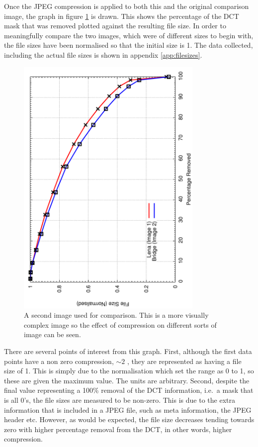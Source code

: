 		Once the JPEG compression is applied to both this and the original comparison image, the graph in figure \ref{fig:comparason_graph} is drawn. This shows the percentage of the DCT mask that was removed plotted against the resulting file size. In order to meaningfully compare the two images, which were of different sizes to begin with, the file sizes have been normalised so that the initial size is 1. The data collected, including the actual file sizes is shown in appendix \ref{app:filesizes}.
		\begin{figure}[ht]
			\centering
			\includegraphics[angle=270,width=0.8\textwidth]{comparason_graph2.pdf}
			\caption{A second image used for comparison. This is a more visually complex image so the effect of compression on different sorts of image can be seen.\label{fig:comparason_graph}}
		\end{figure}

		There are several points of interest from this graph. First, although the first data points have a non zero compression, $\sim2$ , they are represented as having a file size of 1. This is simply due to the normalisation which set the range as 0 to 1, so these are given the maximum value. The units are arbitrary. Second, despite the final value representing a 100\% removal of the DCT information, i.e.\ a mask that is all 0's, the file sizes are measured to be non-zero. This is due to the extra information that is included in a JPEG file, such as meta information, the JPEG header etc. However, as would be expected, the file size decreases tending towards zero with higher percentage removal from the DCT, in other words, higher compression.

